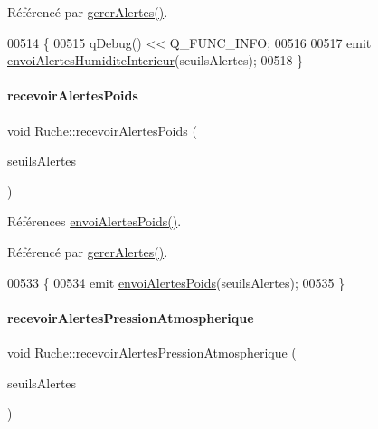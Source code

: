 Référencé par \hyperlink{class_ruche_a80f3538f081aea887d7199f114dfca01}{gerer\+Alertes()}.


\begin{DoxyCode}
00514 \{
00515     qDebug() << Q\_FUNC\_INFO;
00516 
00517     emit \hyperlink{class_ruche_a0f1dfe6d0a677341e29296e044d91975}{envoiAlertesHumiditeInterieur}(seuilsAlertes);
00518 \}
\end{DoxyCode}
\mbox{\label{class_ruche_aa5dc6e5c65d0a685dcaa1c698b25e938}} 
\paragraph{\texorpdfstring{recevoir\+Alertes\+Poids}{recevoirAlertesPoids}}
{\footnotesize\ttfamily void Ruche\+::recevoir\+Alertes\+Poids (\begin{DoxyParamCaption}\item[{\hyperlink{parametres_8h_aaa6de8207c94675264c90b10b613368d}{Seuils\+Alertes}}]{seuils\+Alertes }\end{DoxyParamCaption})\hspace{0.3cm}{\ttfamily [slot]}}



Références \hyperlink{class_ruche_a21d7f05b696896b1a3c7e20c396aaf23}{envoi\+Alertes\+Poids()}.



Référencé par \hyperlink{class_ruche_a80f3538f081aea887d7199f114dfca01}{gerer\+Alertes()}.


\begin{DoxyCode}
00533 \{
00534     emit \hyperlink{class_ruche_a21d7f05b696896b1a3c7e20c396aaf23}{envoiAlertesPoids}(seuilsAlertes);
00535 \}
\end{DoxyCode}
\mbox{\label{class_ruche_aa649f21e5d2a196bc7fbc570dc731ade}} 
\paragraph{\texorpdfstring{recevoir\+Alertes\+Pression\+Atmospherique}{recevoirAlertesPressionAtmospherique}}
{\footnotesize\ttfamily void Ruche\+::recevoir\+Alertes\+Pression\+Atmospherique (\begin{DoxyParamCaption}\item[{\hyperlink{parametres_8h_aaa6de8207c94675264c90b10b613368d}{Seuils\+Alertes}}]{seuils\+Alertes }\end{DoxyParamCaption})\hspace{0.3cm}{\ttfamily [slot]}}




